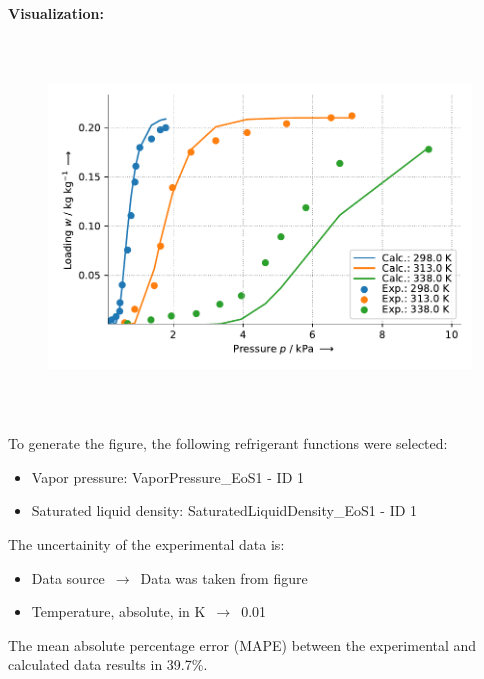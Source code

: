 \textbf{Visualization:}
%
\begin{figure}[!htp]
{\noindent\includegraphics[height=10cm, keepaspectratio]{figs/ads/ads_Water_zeotype_pellet_AQSOA-Z01_DubininAstakhov_2.pdf}}
\end{figure}
%

To generate the figure, the following refrigerant functions were selected:
\begin{itemize}
\item Vapor pressure: VaporPressure\_EoS1 - ID 1
\item Saturated liquid density: SaturatedLiquidDensity\_EoS1 - ID 1
\end{itemize}

The uncertainity of the experimental data is:
\begin{itemize}
\item Data source $\,\to\,$ Data was taken from figure
\item Temperature, absolute, in $\si{\kelvin}$ $\,\to\,$ 0.01
\end{itemize}

The mean absolute percentage error (MAPE) between the experimental and calculated data results in 39.7\%.
\FloatBarrier
\newpage
